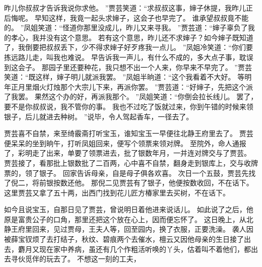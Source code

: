 昨儿你叔叔才告诉我说你求他。
”贾芸笑道：“求叔叔这事，婶子休提，我昨儿正后悔呢。
早知这样，我竟一起头求婶子，这会子也早完了。
谁承望叔叔竟不能的。
”凤姐笑道：“怪道你那里没成儿，昨儿又来寻我。
”贾芸道：“婶子辜负了我的孝心，我并没有这个意思。
若有这个意思，昨儿还不求婶子？如今婶子既知道了，我倒要把叔叔丢下，少不得求婶子好歹疼我一点儿。
”凤姐冷笑道：“你们要拣远路儿走，叫我也难说。
早告诉我一声儿，有什么不成的，多大点子事，耽误到这会子。
那园子里还要种花，我只想不出一个人来，你早来不早完了。
”贾芸笑道：“既这样，婶子明儿就派我罢。
”凤姐半晌道：“这个我看着不大好。
等明年正月里烟火灯烛那个大宗儿下来，再派你罢。
”贾芸道：“好婶子，先把这个派了我罢。
果然这个办的好，再派我那个。
”凤姐笑道：“你倒会拉长线儿。
罢了，要不是你叔叔说，我不管你的事。
我也不过吃了饭就过来，你到午错的时候来领银子，后儿就进去种树。
”说毕，令人驾起香车，一径去了。
\par
贾芸喜不自禁，来至绮霰斋打听宝玉，谁知宝玉一早便往北静王府里去了。
贾芸便呆呆的坐到晌午，打听凤姐回来，便写个领票来领对牌。
至院外，命人通报了，彩明走了出来，单要了领票进去，批了银数年月，一并连对牌交与了贾芸。
贾芸接了，看那批上银数批了二百两，心中喜不自禁，翻身走到银库上，交与收牌票的，领了银子。
回家告诉母亲，自是母子俱各欢喜。
次日一个五鼓，贾芸先找了倪二，将前银按数还他。
那倪二见贾芸有了银子，他便按数收回，不在话下。
这里贾芸又拿了五十两，出西门找到花儿匠方椿家里去买树，不在话下。
\par
如今且说宝玉，自那日见了贾芸，曾说明日着他进来说话儿。
如此说了之后，他原是富贵公子的口角，那里还把这个放在心上，因而便忘怀了。
这日晚上，从北静王府里回来，见过贾母，王夫人等，回至园内，换了衣服，正要洗澡。
袭人因被薛宝钗烦了去打结子，秋纹、碧痕两个去催水，檀云又因他母亲的生日接了出去，麝月又现在家中养病，虽还有几个作粗活听唤的丫头，估着叫不着他们，都出去寻伙觅伴的玩去了。
不想这一刻的工夫，
